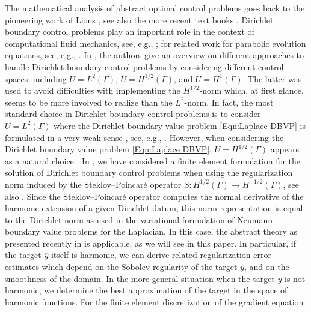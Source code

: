 \documentclass{article}
\numberwithin{equation}{section}
\begin{document}
The mathematical analysis of abstract optimal control problems goes back
to the pioneering work of Lions \cite{Lions1971}, see also the more recent
text books \cite{HinzePinnauUlbrichUlbrich2009,Troeltzsch2010}.
Dirichlet boundary control problems play an important role in the context
of computational fluid mechanics, see, e.g.,
\cite{Fursikov1998,Gunzburger1992,HinzeKunisch2004}; for related work
for parabolic evolution equations, see, e.g.,
\cite{AradaRaymond2002,KunischVexler2007SISC,Lasiecka1978,Liang2025}.
In \cite{KunischVexler2007SISC}, the authors give an overview on
different approaches to handle Dirichlet boundary control problems
by considering different control spaces, including
$U=L^2(\Gamma)$, $U=H^{1/2}(\Gamma)$, and $U=H^1(\Gamma)$. The latter
was used to avoid difficulties with implementing the $H^{1/2}$-norm
which, at first glance, seems to be
more involved to realize than the $L^2$-norm. In fact, the most
standard choice in Dirichlet boundary control problems is to consider
$U=L^2(\Gamma)$ where the Dirichlet boundary value problem
\eqref{Eqn:Laplace DBVP} is formulated in a very weak sense
\cite{Berggren2004}, see, e.g.,
\cite{ApelMateosPfeffererRoesch2015SICO,Casas1993SICON,CasasRaymond2006SICO,
DeckelnickGuentherHinze2009SICO,MayRannacherVexler2013SICO}.
However, when considering the Dirichlet boundary value problem
\eqref{Eqn:Laplace DBVP}, $U = H^{1/2}(\Gamma)$ appears as a
natural choice \cite{BenBelgacem2003}. In 
\cite{OfPhanSteinbach2015NumerMath}, we have considered a finite element
formulation for the solution of Dirichlet boundary control problems when
using the regularization norm induced by the Steklov--Poincar\'e operator
$S : H^{1/2}(\Gamma) \to H^{-1/2}(\Gamma)$, see also
\cite{ChowdhuryGudiNandakumaran2017MathComp}. Since the Steklov--Poincar\'e
operator computes the normal derivative of the harmonic extension of a
given Dirichlet datum, this norm representation is equal to the 
Dirichlet norm as used in the variational formulation of Neumann
boundary value problems for the Laplacian. In this case, the abstract
theory as presented recently in
\cite{LangerLoescherSteinbachYang2025arXiv2505.19062}
is applicable, as we will see in this paper. In particular, if the target
$\overline{y}$ itself is harmonic, we can derive related regularization
error estimates which depend on the Sobolev regularity of the
target $\overline{y}$, and on the smoothness of the domain.
In the more general situation when the target $\overline{y}$ is not harmonic,
we determine the best approximation of the target in the space of harmonic
functions. For the finite element discretization of the gradient equation
\end{document}
